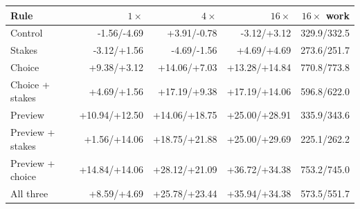 \begin{tabular}{lrrrr}
\toprule
Rule & $1\times$ & $4\times$ & $16\times$ & $16\times$ work \\
\midrule
Control & -1.56/-4.69 & +3.91/-0.78 & -3.12/+3.12 & 329.9/332.5 \\
Stakes & -3.12/+1.56 & -4.69/-1.56 & +4.69/+4.69 & 273.6/251.7 \\
Choice & +9.38/+3.12 & +14.06/+7.03 & +13.28/+14.84 & 770.8/773.8 \\
Choice + stakes & +4.69/+1.56 & +17.19/+9.38 & +17.19/+14.06 & 596.8/622.0 \\
Preview & +10.94/+12.50 & +14.06/+18.75 & +25.00/+28.91 & 335.9/343.6 \\
Preview + stakes & +1.56/+14.06 & +18.75/+21.88 & +25.00/+29.69 & 225.1/262.2 \\
Preview + choice & +14.84/+14.06 & +28.12/+21.09 & +36.72/+34.38 & 753.2/745.0 \\
All three & +8.59/+4.69 & +25.78/+23.44 & +35.94/+34.38 & 573.5/551.7 \\
\bottomrule
\end{tabular}
